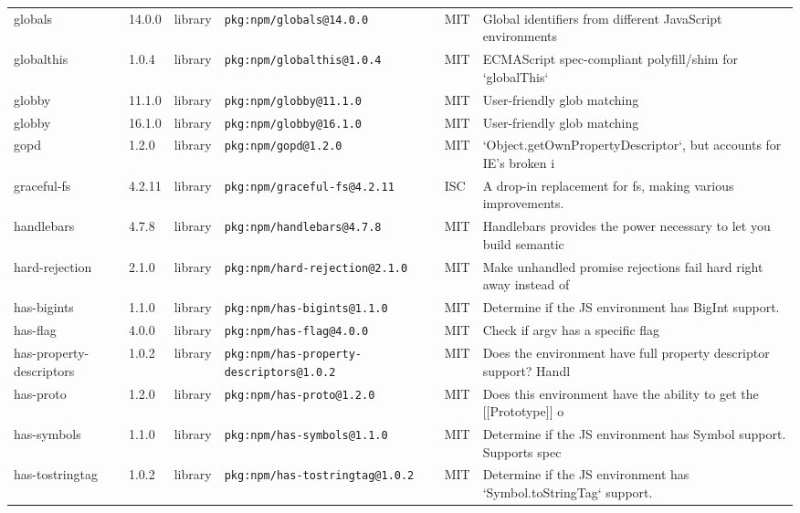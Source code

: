 \documentclass[11pt,a4paper]{article}
\begin{document}
\begin{longtable}{|p{4cm}|p{2cm}|p{1.6cm}|p{5cm}|p{1.5cm}|p{3.5cm}|}
\raggedright globals & 14.0.0 & library & \small\texttt{pkg:npm/globals@14.0.0} & MIT & \small Global identifiers from different JavaScript environments \\
\raggedright globalthis & 1.0.4 & library & \small\texttt{pkg:npm/globalthis@1.0.4} & MIT & \small ECMAScript spec-compliant polyfill/shim for `globalThis` \\
\raggedright globby & 11.1.0 & library & \small\texttt{pkg:npm/globby@11.1.0} & MIT & \small User-friendly glob matching \\
\raggedright globby & 16.1.0 & library & \small\texttt{pkg:npm/globby@16.1.0} & MIT & \small User-friendly glob matching \\
\raggedright gopd & 1.2.0 & library & \small\texttt{pkg:npm/gopd@1.2.0} & MIT & \small `Object.getOwnPropertyDescriptor`, but accounts for IE's broken i \\
\raggedright graceful-fs & 4.2.11 & library & \small\texttt{pkg:npm/graceful-fs@4.2.11} & ISC & \small A drop-in replacement for fs, making various improvements. \\
\raggedright handlebars & 4.7.8 & library & \small\texttt{pkg:npm/handlebars@4.7.8} & MIT & \small Handlebars provides the power necessary to let you build semantic \\
\raggedright hard-rejection & 2.1.0 & library & \small\texttt{pkg:npm/hard-rejection@2.1.0} & MIT & \small Make unhandled promise rejections fail hard right away instead of \\
\raggedright has-bigints & 1.1.0 & library & \small\texttt{pkg:npm/has-bigints@1.1.0} & MIT & \small Determine if the JS environment has BigInt support. \\
\raggedright has-flag & 4.0.0 & library & \small\texttt{pkg:npm/has-flag@4.0.0} & MIT & \small Check if argv has a specific flag \\
\raggedright has-property-descriptors & 1.0.2 & library & \small\texttt{pkg:npm/has-property-descriptors@1.0.2} & MIT & \small Does the environment have full property descriptor support? Handl \\
\raggedright has-proto & 1.2.0 & library & \small\texttt{pkg:npm/has-proto@1.2.0} & MIT & \small Does this environment have the ability to get the [[Prototype]] o \\
\raggedright has-symbols & 1.1.0 & library & \small\texttt{pkg:npm/has-symbols@1.1.0} & MIT & \small Determine if the JS environment has Symbol support. Supports spec \\
\raggedright has-tostringtag & 1.0.2 & library & \small\texttt{pkg:npm/has-tostringtag@1.0.2} & MIT & \small Determine if the JS environment has `Symbol.toStringTag` support. \\

\end{longtable}
\end{document}
